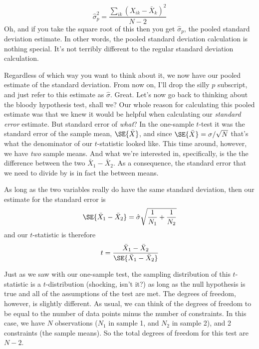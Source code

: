 \begin{mdframed}[style=MyFrame,nobreak=false]
$$
\hat\sigma^2_p = \frac{\sum_{ik} \left( X_{ik} - \bar{X}_k \right)^2}{N -2}
$$
Oh, and if you take the square root of this then you get $\hat{\sigma}_p$, the pooled standard deviation estimate. In other words, the pooled standard deviation calculation is nothing special. It's not terribly different to the regular standard deviation calculation. 
\end{mdframed}


Regardless of which way you want to think about it, we now have our pooled estimate of the standard deviation. From now on, I'll drop the silly $p$ subscript, and just refer to this estimate as $\hat\sigma$. Great. Let's now go back to thinking about the bloody hypothesis test, shall we? Our whole reason for calculating this pooled estimate was that we knew it would be helpful when calculating our {\it standard error} estimate. But standard error of {\it what}? In the one-sample $t$-test it was the standard error of the sample mean, $\SE{\bar{X}}$, and since $\SE{\bar{X}} = \sigma / \sqrt{N}$ that's what the denominator of our $t$-statistic looked like. This time around, however, we have {\it two} sample means. And what we're interested in, specifically, is the the difference between the two $\bar{X}_1 - \bar{X}_2$. As a consequence, the standard error that we need to divide by is in fact the  between means. 

\vspace{0.5cm}
\begin{mdframed}[style=MyFrame,nobreak=true]
As long as the two variables really do have the same standard deviation, then our estimate for the standard error is
$$
\SE{\bar{X}_1 - \bar{X}_2} = \hat\sigma \sqrt{\frac{1}{N_1} + \frac{1}{N_2}}
$$
and our $t$-statistic is therefore 
$$
t = \frac{\bar{X}_1 - \bar{X}_2}{\SE{\bar{X}_1 - \bar{X}_2}}
$$
\end{mdframed}

Just as we saw with our one-sample test, the sampling distribution of this $t$-statistic is a $t$-distribution (shocking, isn't it?) as long as the null hypothesis is true and all of the assumptions of the test are met. The degrees of freedom, however, is slightly different. As usual, we can think of the degrees of freedom to be equal to the number of data points minus the number of constraints. In this case, we have $N$ observations ($N_1$ in sample 1, and $N_2$ in sample 2), and 2 constraints (the sample means). So the total degrees of freedom for this test are $N-2$. 

